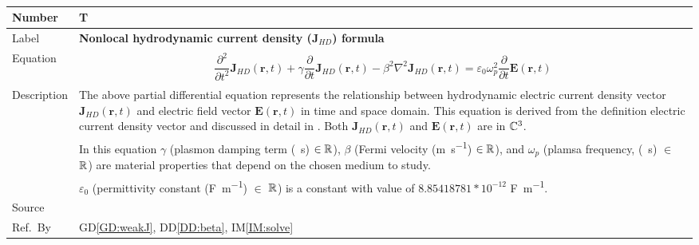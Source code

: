 \documentclass[12pt]{article}
\newcommand{\colBwidth}{0.82\textwidth} \newcommand{\colCwidth}{0.1\textwidth}
\begin{document}
	~\newline \noindent \begin{minipage}{\textwidth}
		\renewcommand*{\arraystretch}{1.5} \begin{tabular}{| p{\colAwidth} |
				p{\colBwidth}|} \hline \rowcolor[gray]{0.9} Number&
			T{theorynum}\thetheorynum \label{TM:J}\\ \hline Label&\bf
			Nonlocal hydrodynamic current density (J$_{HD}$) formula \\ \hline Equation&
			\begin{equation} \label{eq:Jnonlocal} \begin{gathered}
					\dfrac{\partial^{2}}{\partial t^{2}}\textbf{J}_{HD}(\textbf{r},t)	+
					\gamma\dfrac{\partial}{\partial t}\textbf{J}_{HD}(\textbf{r},t) -
					\beta^{2}\nabla^{2}\textbf{J}_{HD}(\textbf{r},t) =
					\varepsilon_{0}\omega^{2}_{p}\dfrac{\partial}{\partial t}
					\textbf{E}(\textbf{r},t) \end{gathered}  \end{equation} \\
			
			
			\hline Description & The above partial differential equation represents the
			relationship between hydrodynamic electric current density vector
			$\textbf{J}_{HD}(\textbf{r},t)$ and electric field vector
			$\textbf{E}(\textbf{r},t)$ in time and space domain. This equation is derived
			from the definition electric current density vector and discussed in detail in
			\cite{hiremath2012numerical}. Both $\textbf{J}_{HD}(\textbf{r},t)$ and
			$\textbf{E}(\textbf{r},t)$ are in $\Bbb C^3$.\\ & In this equation $\gamma$
			(plasmon damping term (\si{\per \second}) $\in \Bbb R$), $\beta$ (Fermi
			velocity (\si{\meter \per \second}) $\in \Bbb R$), and $\omega_p$ (plamsa
			frequency, (\si{\per \second}) $\in$ $\Bbb R$) are material properties that
			depend on the chosen medium to study.\\ & $\varepsilon_0$ (permittivity
			constant (\si{\farad \per \meter}) $\in$ $\Bbb R$) is a constant with value of
			$8.85418781*10^{-12}$ \si{\farad \per \meter}. \\ \hline Source &
			\cite{hiremath2012numerical} \\ %
			\hline Ref.\ By & GD\ref{GD:weakJ}, DD\ref{DD:beta}, IM\ref{IM:solve}\\ \hline
	\end{tabular} \end{minipage}\\
	
\end{document}

